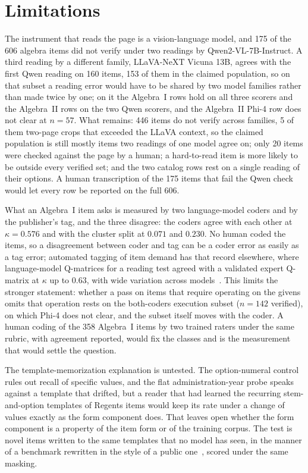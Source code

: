 \section{Limitations}
\label{sec:limitations}

The instrument that reads the page is a vision-language model, and 175 of the 606 algebra items did not verify under two readings by Qwen2-VL-7B-Instruct. A third reading by a different family, LLaVA-NeXT Vicuna 13B, agrees with the first Qwen reading on 160 items, 153 of them in the claimed population, so on that subset a reading error would have to be shared by two model families rather than made twice by one; on it the Algebra~I rows hold on all three scorers and the Algebra~II rows on the two Qwen scorers, and the Algebra~II Phi-4 row does not clear at $n=57$. What remains: 446 items do not verify across families, 5 of them two-page crops that exceeded the LLaVA context, so the claimed population is still mostly items two readings of one model agree on; only 20 items were checked against the page by a human; a hard-to-read item is more likely to be outside every verified set; and the two catalog rows rest on a single reading of their options. A human transcription of the 175 items that fail the Qwen check would let every row be reported on the full 606.

What an Algebra~I item asks is measured by two language-model coders and by the publisher's tag, and the three disagree: the coders agree with each other at $\kappa=0.576$ and with the cluster split at $0.071$ and $0.230$. No human coded the items, so a disagreement between coder and tag can be a coder error as easily as a tag error; automated tagging of item demand has that record elsewhere, where language-model Q-matrices for a reading test agreed with a validated expert Q-matrix at $\kappa$ up to $0.63$, with wide variation across models~\cite{Fan_Bialo_2026}. This limits the stronger statement: whether a pass on items that require operating on the givens omits that operation rests on the both-coders execution subset ($n=142$ verified), on which Phi-4 does not clear, and the subset itself moves with the coder. A human coding of the 358 Algebra~I items by two trained raters under the same rubric, with agreement reported, would fix the classes and is the measurement that would settle the question.

The template-memorization explanation is untested. The option-numeral control rules out recall of specific values, and the flat administration-year probe speaks against a template that drifted, but a reader that had learned the recurring stem-and-option templates of Regents items would keep its rate under a change of values exactly as the form component does. That leaves open whether the form component is a property of the item form or of the training corpus. The test is novel items written to the same templates that no model has seen, in the manner of a benchmark rewritten in the style of a public one~\cite{zhang2024gsm1k}, scored under the same masking.

